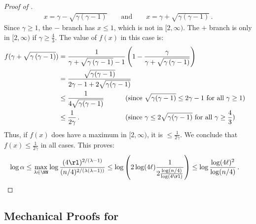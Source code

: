 \begin{proof}[Proof of ]
  \begin{align*}
    x = \gamma-\sqrt{\gamma\left(\gamma-1\right)} \qquad \text{and} \qquad  x = \gamma+\sqrt{\gamma\left(\gamma-1\right)} \,.
  \end{align*}
  Since $\gamma \ge 1$, the $-$ branch has $x \le 1$, which is not in $[2,\infty)$. The $+$ branch is only in $[2,\infty)$ if $\gamma \ge \frac{4}{3}$. The value of $f(x)$ in this case is:
  \begin{align*}
    f(\gamma+\sqrt{\gamma\left(\gamma-1\right)}) &= \frac{1}{\gamma+\sqrt{\gamma\left(\gamma-1\right)} - 1} \left(1 - \frac{\gamma}{\gamma+\sqrt{\gamma\left(\gamma-1\right)}} \right) \\
      &= \frac{\sqrt{\gamma(\gamma-1)}}{2 \gamma - 1 + 2 \sqrt{\gamma(\gamma-1)}} \\
      &\le \frac{1}{4 \sqrt{\gamma(\gamma-1)}}  &&\hspace{-4cm}\text{(since $\sqrt{\gamma(\gamma-1)} \le 2 \gamma - 1$ for all $\gamma \ge 1$)}
      \\
      &\le \frac{1}{2 \gamma} \,. &&\hspace{-4cm}\text{(since $\gamma \le 2 \sqrt{\gamma(\gamma-1)}$ for all $\gamma \ge \frac{4}{3}$)}
  \end{align*}
  Thus, if $f(x)$ does have a maximum in $[2,\infty)$, it is $\le \frac{1}{2\gamma}$. We conclude that $f(x) \le \frac{1}{2\gamma}$ in all cases. This proves:
  \begin{align*}
    \log \alpha \le \max_{\lambda \in \NN} \log \frac{(4 \rl)^{2/(\lambda-1)}}{(n/4)^{2/(\lambda(\lambda-1))}} 
      &\le \log\left(2 \log(4 \ell) \frac{1}{2 \frac{\log(n/4)}{\log(4\rl)}} \right) \le \log \frac{  \log(4 \ell)^2}{\log(n/4)} \,. \qedhere
  \end{align*}
\end{proof}


\subsection{Mechanical Proofs for \texorpdfstring{}{Pseudo-Deterministic and Random Seed Lower Bounds}}\label{subsec:pd-lb-mech}


